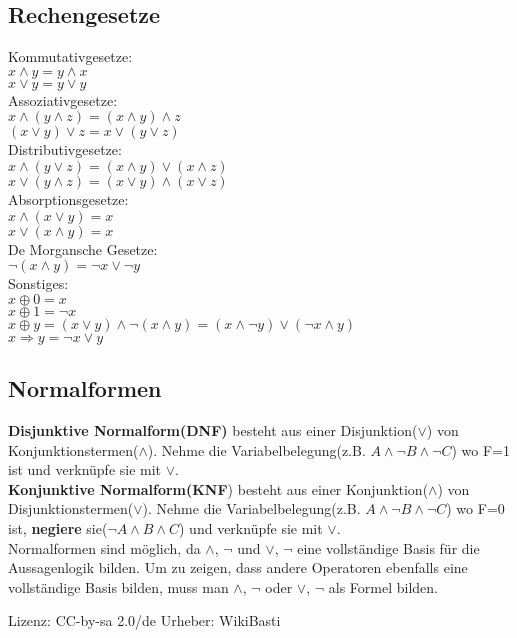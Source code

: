 \documentclass[11pt]{article}
\begin{document}
\subsection{Rechengesetze}
Kommutativgesetze:\\ $x \land y = y \land x$ \\ $x \lor y = y \lor y$ \\
Assoziativgesetze: \\ $x \land ( y \land z ) = ( x \land y ) \land z $ \\ $( x \lor y ) \lor z = x \lor( y \lor z )$ \\
Distributivgesetze: \\ $x \land ( y \lor z ) = ( x \land y ) \lor ( x \land z )$ \\  	$x \lor ( y \land z ) = ( x \lor y ) \land ( x \lor z )$ \\
Absorptionsgesetze: \\ $x \land ( x \lor y ) = x$ \\ $x \lor ( x \land y ) = x$\\
De Morgansche Gesetze: \\ $\neg ( x \land y ) = \neg x \lor \neg y$ \\
Sonstiges: \\ $x \oplus 0 = x$\\ $x \oplus 1 = \neg x$ \\ $ x \oplus y = (x \lor y) \land \neg ( x \land y ) = ( x \land \neg y ) \lor ( \neg x \land y )$ \\ $ x \Rightarrow y = \neg x \lor y $
\subsection{Normalformen}
{\bfseries Disjunktive Normalform(DNF)} besteht aus einer Disjunktion($\lor$) von Konjunktionstermen($\land$). Nehme die Variabelbelegung(z.B. $A \land \neg B \land \neg C$) wo F=1 ist und verkn{\"u}pfe sie mit $\lor$. \\
{\bfseries Konjunktive Normalform(KNF}) besteht aus einer Konjunktion($\land$) von Disjunktionstermen($\lor$). Nehme die Variabelbelegung(z.B. $A \land \neg B \land \neg C$) wo F=0 ist, {\bfseries negiere} sie($\neg A \land B \land C$) und verkn{\"u}pfe sie mit $\lor$. \\
Normalformen sind m{\"o}glich, da $\land$, $\neg$ und $\lor$, $\neg$ eine vollst{\"a}ndige Basis f{\"u}r die Aussagenlogik bilden. Um zu zeigen, dass andere Operatoren ebenfalls eine vollst{\"a}ndige Basis bilden, muss man $\land$, $\neg$ oder $\lor$, $\neg$ als Formel bilden. \\
\begin{figure}[H]
  \centering
  \def\svgwidth{400pt}
	\end{figure}\scriptsize  Lizenz: CC-by-sa 2.0{/}de Urheber: WikiBasti\normalsize
\end{document}
